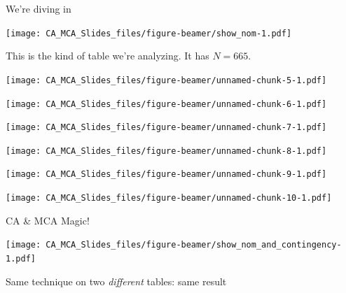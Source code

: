 \documentclass[
  ignorenonframetext,
]{beamer}
\begin{document}
\begin{frame}{We're diving in}
\protect\hypertarget{were-diving-in-1}{}

\texttt{[image: CA\_MCA\_Slides\_files/figure-beamer/show\_nom-1.pdf]}

This is the kind of table we're analyzing. It has \(N = 665\).

\end{frame}

\begin{frame}

\texttt{[image: CA\_MCA\_Slides\_files/figure-beamer/unnamed-chunk-5-1.pdf]}

\end{frame}

\begin{frame}

\texttt{[image: CA\_MCA\_Slides\_files/figure-beamer/unnamed-chunk-6-1.pdf]}

\end{frame}

\begin{frame}

\texttt{[image: CA\_MCA\_Slides\_files/figure-beamer/unnamed-chunk-7-1.pdf]}

\end{frame}

\begin{frame}

\texttt{[image: CA\_MCA\_Slides\_files/figure-beamer/unnamed-chunk-8-1.pdf]}

\end{frame}

\begin{frame}

\texttt{[image: CA\_MCA\_Slides\_files/figure-beamer/unnamed-chunk-9-1.pdf]}

\end{frame}

\begin{frame}

\texttt{[image: CA\_MCA\_Slides\_files/figure-beamer/unnamed-chunk-10-1.pdf]}

\end{frame}

\begin{frame}{CA \& MCA Magic!}
\protect\hypertarget{ca-mca-magic}{}

\texttt{[image: CA\_MCA\_Slides\_files/figure-beamer/show\_nom\_and\_contingency-1.pdf]}

Same technique on two \emph{different} tables: same result

\end{frame}
\end{document}

